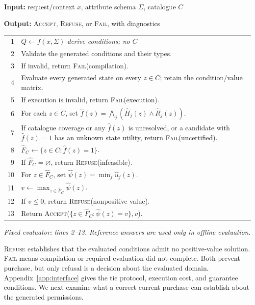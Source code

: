\documentclass[11pt]{article}
\begin{document}
\begin{algorithm}[t]
\caption{Risk-aware purchase selection}
\label{alg:decision}
\small
\textbf{Input:} request/context $x$, attribute schema $\Sigma$, catalogue $C$\par
\textbf{Output:} \textsc{Accept}, \textsc{Refuse}, or \textsc{Fail}, with diagnostics\par\smallskip
\begin{tabular}{@{}r@{\quad}p{}@{}}
1 & $Q\leftarrow f(x,\Sigma)$ \quad\emph{derive conditions; no $C$}\\
2 & Validate the generated conditions and their types.\\
3 & If invalid, return \textsc{Fail}(compilation).\\
4 & Evaluate every generated state on every $z\in C$; retain the condition/value matrix.\\
5 & If execution is invalid, return \textsc{Fail}(execution).\\
6 & For each $z\in C$, set $\widehat f(z)=\bigwedge_j(\widehat H_j(z)\wedge\widehat R_j(z))$.\\
7 & If catalogue coverage or any $\widehat f(z)$ is unresolved, or a candidate with $\widehat f(z)=1$ has an unknown state utility, return \textsc{Fail}(uncertified).\\
8 & $\widehat F_C\leftarrow\{z\in C:\widehat f(z)=1\}$.\\
9 & If $\widehat F_C=\varnothing$, return \textsc{Refuse}(infeasible).\\
10 & For $z\in\widehat F_C$, set $\widehat\psi(z)=\min_j\widehat u_j(z)$.\\
11 & $v\leftarrow\max_{z\in\widehat F_C}\widehat\psi(z)$.\\
12 & If $v\le0$, return \textsc{Refuse}(nonpositive value).\\
13 & Return \textsc{Accept}($\{z\in\widehat F_C:\widehat\psi(z)=v\},v$).\\
\end{tabular}\smallskip\par
\emph{Fixed evaluator: lines 2--13. Reference answers are used only in offline evaluation.}
\end{algorithm}

\textsc{Refuse} establishes that the evaluated conditions admit no positive-value solution. \textsc{Fail} means compilation or required evaluation did not complete. Both prevent purchase, but only refusal is a decision about the evaluated domain. Appendix~\ref{app:interface} gives the tie protocol, execution cost, and guarantee conditions. We next examine what a correct current purchase can establish about the generated permissions.
\end{document}
